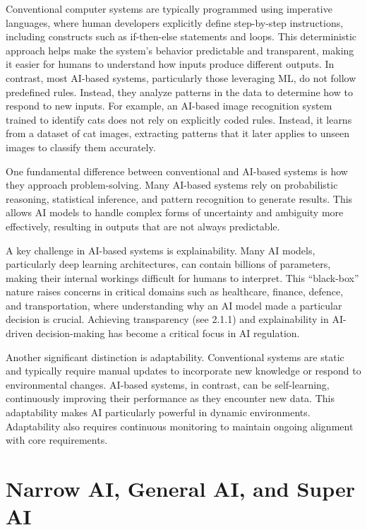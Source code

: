 \documentclass[
  letterpaper,
  DIV=11,
  numbers=noendperiod,
  oneside]{scrreprt}
\begin{document}
\begin{tcolorbox}
Conventional computer systems are typically programmed using imperative
languages, where human developers explicitly define step-by-step
instructions, including constructs such as if-then-else statements and
loops. This deterministic approach helps make the system's behavior
predictable and transparent, making it easier for humans to understand
how inputs produce different outputs. In contrast, most AI{}-based
systems, particularly those leveraging ML{}, do not follow predefined
rules. Instead, they analyze patterns in the data to determine how to
respond to new inputs. For example, an AI-based image recognition system
trained to identify cats does not rely on explicitly coded rules.
Instead, it learns from a dataset of cat images, extracting patterns
that it later applies to unseen images to classify them accurately.

One fundamental difference between conventional and AI-based systems{}
is how they approach problem-solving. Many AI-based systems rely on
probabilistic reasoning, statistical inference, and pattern recognition
to generate results. This allows AI models to handle complex forms of
uncertainty and ambiguity more effectively, resulting in outputs that
are not always predictable.

A key challenge in AI-based systems is explainability. Many AI models,
particularly deep learning architectures, can contain billions of
parameters, making their internal workings difficult for humans to
interpret. This ``black-box'' nature raises concerns in critical domains
such as healthcare, finance, defence, and transportation, where
understanding why an AI model made a particular decision is crucial.
Achieving transparency (see 2.1.1) and explainability in AI-driven
decision-making has become a critical focus in AI regulation.

Another significant distinction is adaptability. Conventional systems
are static and typically require manual updates to incorporate new
knowledge or respond to environmental changes. AI-based systems, in
contrast, can be self-learning, continuously improving their performance
as they encounter new data. This adaptability makes AI particularly
powerful in dynamic environments. Adaptability also requires continuous
monitoring to maintain ongoing alignment with core requirements.

\section{Narrow AI, General AI, and Super
AI}\label{narrow-ai-general-ai-and-super-ai}


\end{tcolorbox}
\end{document}
